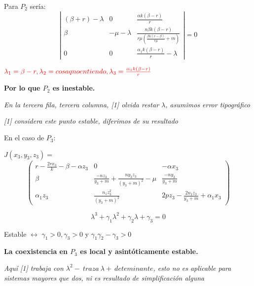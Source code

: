 \documentclass{beamer}
\begin{document}
\begin{frame}
    Para $P_2$ sería:
    $$\left|
        \begin{array}{ccc}
            (\beta+r)-\lambda & 0            & \frac{\alpha k(\beta-r)}{r}                                      \\
            \beta             & -\mu-\lambda & \frac{n\beta k(\beta-r)}{r\mu (\frac{\beta k(r-\beta)}{r\mu}+m)} \\
            0                 & 0            & \frac{\alpha_1 k(\beta-r)}{r}-\lambda
        \end{array}
        \right| =0$$

    $\textcolor{red}{\lambda_1=\beta-r, \lambda_2=cosa q no entiendo, \lambda_3=\frac{\alpha_1 k(\beta-r)}{r}}$

    {\bf Por lo que $P_2$ es inestable.}
    \vspace*{0.7cm}

    {\it\scriptsize En la tercera fila, tercera columna, [1] olvida restar $\lambda$, asumimos error tipográfico}

    {\it\scriptsize [1] considera este punto estable, diferimos de su resultado}

\end{frame}
\begin{frame}

    En el caso de $P_3$:
    \vspace*{0.5cm}

    $J(x_3, y_3, z_3) =$
    $$
        \left(
        \begin{array}{ccc}
                r-\frac{2rx_3}{k}-\beta-\alpha z_3 & 0                                                 & -\alpha x_3                             \\
                \beta                              & \frac{-nz_3}{y_3+m}+\frac{ny_3z_3}{(y_3+m)^2}-\mu & \frac{-ny_3}{y_3+m}                     \\
                \alpha_1z_3                        & \frac{n_1z_3^2}{(y_3+m)^2}                        & 2pz_3-\frac{2n_1z_3}{y_3+m}+\alpha_1x_3
            \end{array}
        \right)$$
\end{frame}
\begin{frame}
    $$\lambda^3+\gamma_1\lambda^2+\gamma_2\lambda+\gamma_3=0 $$

    Estable $\leftrightarrow$ $\gamma_1>0, \gamma_3>0$ y $\gamma_1\gamma_2-\gamma_3>0$
    \vspace*{0.3cm}

    {\bf La coexistencia en $P_3$ es local y asintóticamente estable.}
    \vspace*{0.3cm}

    {\it \scriptsize Aquí [1] trabaja con $\lambda^2-\ traza\ \lambda+\ deteminante$, esto no es aplicable para sistemas mayores que dos, ni
    es resultado de simplificación alguna}
\end{frame}
\end{document}
